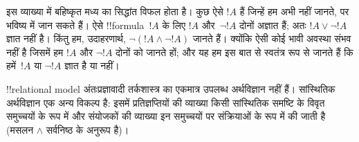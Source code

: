 \documentclass[../../../include/open-logic-section]{subfiles}
\begin{document}
इस व्याख्या में बहिष्कृत मध्य का सिद्धांत विफल होता है। कुछ ऐसे $!A$ हैं
जिन्हें हम अभी नहीं जानते, पर भविष्य में जान सकते हैं। ऐसे !!{formula}~$!A$
के लिए $!A$ और~$\lnot !A$ दोनों अज्ञात हैं; अतः $!A \lor \lnot !A$ ज्ञात
नहीं है। किंतु हम, उदाहरणार्थ, $\lnot(!A \land \lnot !A)$ जानते हैं। क्योंकि
ऐसी कोई भावी अवस्था संभव नहीं है जिसमें हम $!A$ और $\lnot !A$ दोनों को
जानते हों; और यह हम इस बात से स्वतंत्र रूप से जानते हैं कि हमें~$!A$ या
$\lnot !A$ ज्ञात है या नहीं।

!!{relational model} अंतःप्रज्ञावादी तर्कशास्त्र का एकमात्र उपलब्ध
अर्थविज्ञान नहीं हैं। सांस्थितिक अर्थविज्ञान एक अन्य विकल्प है: इसमें
प्रतिज्ञप्तियों की व्याख्या किसी सांस्थितिक समष्टि के विवृत समुच्चयों के रूप
में और संयोजकों की व्याख्या इन समुच्चयों पर संक्रियाओं के रूप में की जाती
है (मसलन $\land$ सर्वनिष्ठ के अनुरूप है)।
\end{document}
